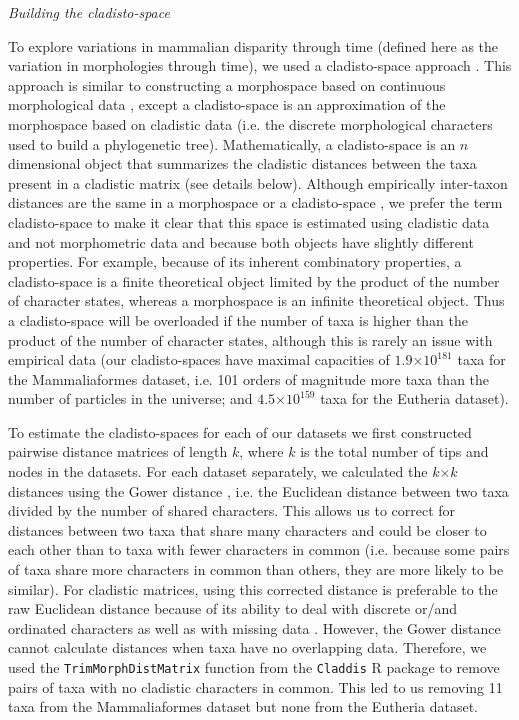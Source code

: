 \documentclass[12pt,letterpaper]{article}
\renewcommand{\subsection}[1]{%
\bigskip
\begin{center}
\begin{large}
\normalfont\itshape #1
\end{large}
\end{center}}
\begin{document}
\subsection{Building the cladisto-space}
To explore variations in mammalian disparity through time (defined here as the variation in morphologies through time), we used a cladisto-space approach \citep[e.g.][]{Foote01071994,Foote29111996,Wesley-Hunt2005,Brusatte12092008,friedmanexplosive2010,toljagictriassic-jurassic2013,Hughes20082013}.
This approach is similar to constructing a morphospace based on continuous morphological data \citep[e.g.][]{friedmanexplosive2010}, except a cladisto-space is an approximation of the morphospace based on cladistic data (i.e. the discrete morphological characters used to build a phylogenetic tree).
Mathematically, a cladisto-space is an $n$ dimensional object that summarizes the cladistic distances between the taxa present in a cladistic matrix (see details below).
Although empirically inter-taxon distances are the same in a morphospace or a cladisto-space \citep{foth2012different,hetherington2015cladistic}, we prefer the term cladisto-space to make it clear that this space is estimated using cladistic data and not morphometric data and because both objects have slightly different properties.
For example, because of its inherent combinatory properties, a cladisto-space is a finite theoretical object limited by the product of the number of character states, whereas a morphospace is an infinite theoretical object.
Thus a cladisto-space will be overloaded if the number of taxa is higher than the product of the number of character states, although this is rarely an issue with empirical data (our cladisto-spaces have maximal capacities of $1.9$$\times$$10^{181}$ taxa for the Mammaliaformes dataset, i.e. 101 orders of magnitude more taxa than the number of particles in the universe; and $4.5$$\times$$10^{159}$ taxa for the Eutheria dataset).

To estimate the cladisto-spaces for each of our datasets we first constructed pairwise distance matrices of length $k$, where $k$ is the total number of tips and nodes in the datasets.
For each dataset separately, we calculated the $k$$\times$$k$ distances using the Gower distance \citep{Gower71}, i.e. the Euclidean distance between two taxa divided by the number of shared characters. 
This allows us to correct for distances between two taxa that share many characters and could be closer to each other than to taxa with fewer characters in common (i.e. because some pairs of taxa share more characters in common than others, they are more likely to be similar).
For cladistic matrices, using this corrected distance is preferable to the raw Euclidean distance because of its ability to deal with discrete or/and ordinated characters as well as with missing data \citep{anderson2012using}.
However, the Gower distance cannot calculate distances when taxa have no overlapping data.
Therefore, we used the \texttt{TrimMorphDistMatrix} function from the \texttt{Claddis} R package \citep{Claddis} to remove pairs of taxa with no cladistic characters in common.
This led to us removing 11 taxa from the Mammaliaformes dataset but none from the Eutheria dataset.
\end{document}
